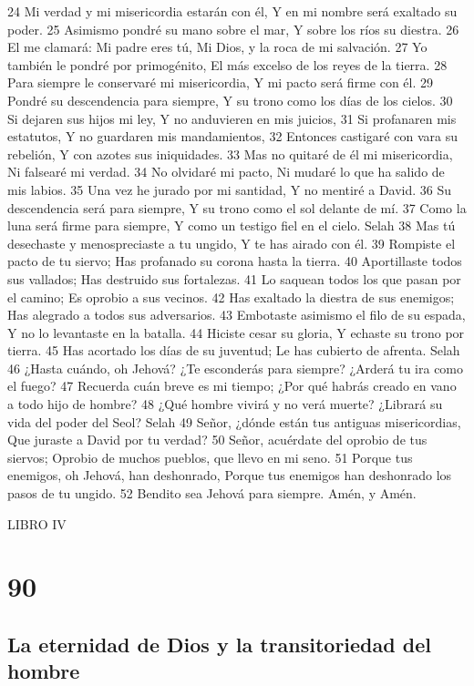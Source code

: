 24 Mi verdad y mi misericordia estarán con él,
Y en mi nombre será exaltado su poder.
25 Asimismo pondré su mano sobre el mar,
Y sobre los ríos su diestra.
26 El me clamará: Mi padre eres tú,
Mi Dios, y la roca de mi salvación.
27 Yo también le pondré por primogénito,
El más excelso de los reyes de la tierra.
28 Para siempre le conservaré mi misericordia,
Y mi pacto será firme con él.
29 Pondré su descendencia para siempre,
Y su trono como los días de los cielos.
30 Si dejaren sus hijos mi ley,
Y no anduvieren en mis juicios,
31 Si profanaren mis estatutos,
Y no guardaren mis mandamientos,
32 Entonces castigaré con vara su rebelión,
Y con azotes sus iniquidades.
33 Mas no quitaré de él mi misericordia,
Ni falsearé mi verdad.
34 No olvidaré mi pacto,
Ni mudaré lo que ha salido de mis labios.
35 Una vez he jurado por mi santidad,
Y no mentiré a David.
36 Su descendencia será para siempre,
Y su trono como el sol delante de mí.
37 Como la luna será firme para siempre,
Y como un testigo fiel en el cielo. Selah
38 Mas tú desechaste y menospreciaste a tu ungido,
Y te has airado con él.
39 Rompiste el pacto de tu siervo;
Has profanado su corona hasta la tierra.
40 Aportillaste todos sus vallados;
Has destruido sus fortalezas.
41 Lo saquean todos los que pasan por el camino;
Es oprobio a sus vecinos.
42 Has exaltado la diestra de sus enemigos;
Has alegrado a todos sus adversarios.
43 Embotaste asimismo el filo de su espada,
Y no lo levantaste en la batalla.
44 Hiciste cesar su gloria,
Y echaste su trono por tierra.
45 Has acortado los días de su juventud;
Le has cubierto de afrenta. Selah
46 ¿Hasta cuándo, oh Jehová? ¿Te esconderás para siempre?
¿Arderá tu ira como el fuego?
47 Recuerda cuán breve es mi tiempo;
¿Por qué habrás creado en vano a todo hijo de hombre?
48 ¿Qué hombre vivirá y no verá muerte?
¿Librará su vida del poder del Seol? Selah
49 Señor, ¿dónde están tus antiguas misericordias,
Que juraste a David por tu verdad?
50 Señor, acuérdate del oprobio de tus siervos;
Oprobio de muchos pueblos, que llevo en mi seno.
51 Porque tus enemigos, oh Jehová, han deshonrado,
Porque tus enemigos han deshonrado los pasos de tu ungido.
52 Bendito sea Jehová para siempre.
Amén, y Amén.



LIBRO IV

\chapter{90}

\section*{La eternidad de Dios y la transitoriedad del hombre}

